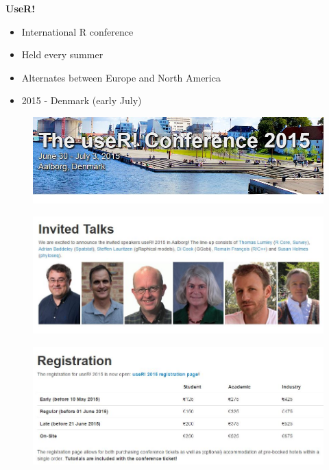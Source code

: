 \documentclass{beamer}
\begin{document}
\begin{frame}
	
	\LARGE
	\textbf{UseR!}
	\begin{itemize}
		\item International R conference
		\item Held every summer
		\item Alternates between Europe and North America
		\item 2015 - Denmark (early July)
	\end{itemize}
\end{frame}
\begin{frame}
	\begin{figure}
		\centering
		\includegraphics[width=0.99\linewidth]{user1}

	\end{figure}
	
\end{frame}
\begin{frame}
	\begin{figure}
		\centering
		\includegraphics[width=0.99\linewidth]{user2}
		
	\end{figure}
	
\end{frame}
\begin{frame}
	\begin{figure}
		\centering
		\includegraphics[width=1.11\linewidth]{userprices}

	\end{figure}
	
\end{frame}
\end{document}
